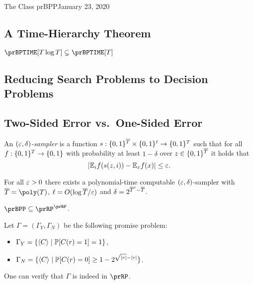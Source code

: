 \begin{lecture}{1}{The Class prBPP}{January 23, 2020}
\subsection{A Time-Hierarchy Theorem}

\begin{theorem}
  $\prBPTIME[T \log{T}] \subsetneq \prBPTIME[T]$
\end{theorem}


\subsection{Reducing Search Problems to Decision Problems}

\subsection{Two-Sided Error vs.\ One-Sided Error}


\begin{definition}
  An \emph{$(\varepsilon, \delta)$-sampler} is a function $s :
  \{0,1\}^{\overline{T}} \times \{0,1\}^\ell \to \{0,1\}^T$ such that for
  all $f : \{0,1\}^T \to \{0,1\}$ with probability at least $1 - \delta$ 
  over $z \in \{0,1\}^{\overline{T}}$ it holds that \[
    |\mathbb{E}_i f(s(z, i)) - \mathbb{E}_x f(x)| \le \varepsilon.
  \]
\end{definition}

\begin{theorem}
  For all $\varepsilon > 0$ there exists a polynomial-time computable $(\varepsilon,
  \delta)$-sampler with $\overline{T} = \poly(T)$, $\ell = O(\log
  \overline{T}/\varepsilon)$ and $\delta = 2^{\overline{T}^\varepsilon - \overline{T}}$.
\end{theorem}


\begin{theorem}\label{thm:bpp-subset-rprp}
    $\prBPP \subseteq \prRP^\prRP$.
\end{theorem}

\begin{proofsk}
    Let $\Gamma = (\Gamma_Y, \Gamma_N)$ be the following promise problem:
    \begin{itemize}
        \item $\Gamma_Y = \{\langle C \rangle \mid \mathbb{P}[C(r) = 1] = 1\}$,
        \item $\Gamma_N = \{\langle C \rangle \mid \mathbb{P}[C(r) = 0] \geq 1 - 2^{\sqrt{|r|} - |r|}\}$.
    \end{itemize}
    One can verify that $\Gamma$ is indeed in $\prRP$.


\end{proofsk}
\end{lecture}
